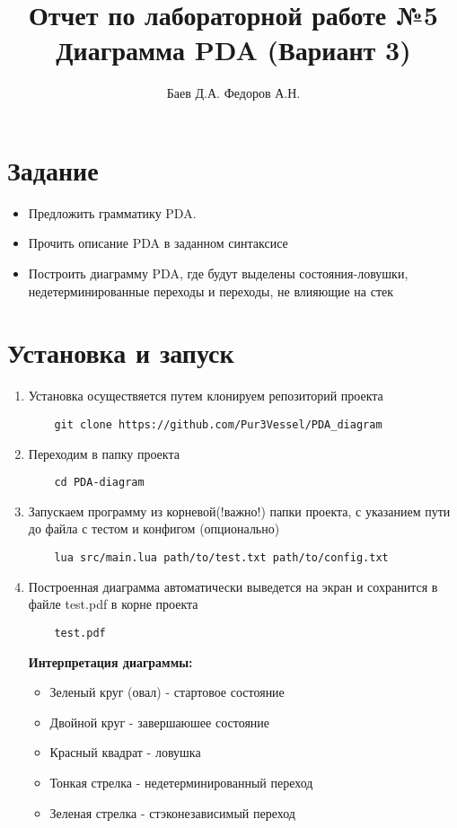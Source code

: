 \documentclass{article}
\title{Отчет по лабораторной работе №5 \\Диаграмма PDA (Вариант 3)}
\author{Баев Д.А. Федоров А.Н.}
\begin{document}
\maketitle


\section{Задание}
\begin{itemize}
  \item Предложить грамматику PDA.
  \item Прочить описание PDA в заданном синтаксисе
  \item Построить диаграмму PDA, где будут выделены состояния-ловушки, недетерминированные переходы и переходы, не влияющие на стек
\end{itemize}


\section{Установка и запуск}

\begin{enumerate}
    \item Установка осуществяется путем клонируем репозиторий проекта
    \begin{lstlisting}
    git clone https://github.com/Pur3Vessel/PDA_diagram
    \end{lstlisting}
    \item Переходим в папку проекта
    \begin{lstlisting}
    cd PDA-diagram
    \end{lstlisting}
    \item Запускаем программу из корневой(!важно!) папки проекта, с указанием пути до файла с тестом и конфигом (опционально)
    \begin{lstlisting}
    lua src/main.lua path/to/test.txt path/to/config.txt
    \end{lstlisting}
    \item Построенная диаграмма автоматически выведется на экран и сохранится в файле test.pdf в корне проекта
    \begin{lstlisting}
    test.pdf
    \end{lstlisting}
    \textbf{Интерпретация диаграммы:}
    \begin{itemize}
        \item Зеленый круг (овал) - стартовое состояние
        \item Двойной круг - завершаюшее состояние
        \item Красный квадрат - ловушка
        \item Тонкая стрелка - недетерминированный переход
        \item Зеленая стрелка - стэконезависимый переход
    \end{itemize}
    
\end{enumerate}
\end{document}
